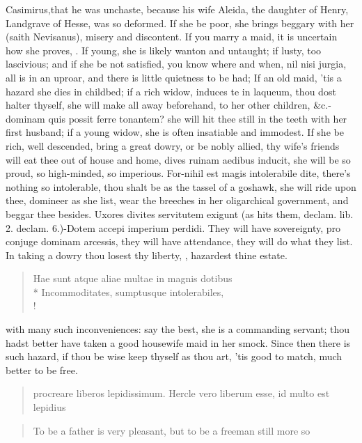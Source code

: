 Casimirus,that he was unchaste, because his wife Aleida, the
daughter of Henry, Landgrave of Hesse, was so deformed. If she be poor,
she brings beggary with her (saith Nevisanus), misery and discontent.
If you marry a maid, it is uncertain how she proves, . If young, she is likely wanton and untaught;
if lusty, too lascivious; and if she be not satisfied, you know where
and when, nil nisi jurgia, all is in an uproar, and there is little
quietness to be had; If an old maid, 'tis a hazard she dies in
childbed; if a rich widow, induces te in laqueum, thou dost
halter thyself, she will make all away beforehand, to her other
children, \&c.-dominam quis possit ferre tonantem? she will hit
thee still in the teeth with her first husband; if a young widow, she
is often insatiable and immodest. If she be rich, well descended, bring
a great dowry, or be nobly allied, thy wife's friends will eat thee out
of house and home, dives ruinam aedibus inducit, she will be so proud,
so high-minded, so imperious. For-nihil est magis intolerabile dite,
there's nothing so intolerable, thou shalt be as the tassel of a
goshawk, she will ride upon thee, domineer as she list, wear the
breeches in her oligarchical government, and beggar thee besides.
Uxores divites servitutem exigunt (as \Seneca{} hits them, declam. lib. 2.
declam. 6.)-Dotem accepi imperium perdidi. They will have sovereignty,
pro conjuge dominam arcessis, they will have attendance, they will do
what they list. In taking a dowry thou losest thy liberty, , hazardest thine estate.

\begin{latin}
\begin{verse}%
Hae sunt atque aliae multae in magnis dotibus\\*
Incommoditates, sumptusque intolerabiles, \etc{}\\!
\end{verse}%
\end{latin}

with many such inconveniences: say the best, she is a commanding
servant; thou hadst better have taken a good housewife maid in her
smock. Since then there is such hazard, if thou be wise keep thyself as
thou art, 'tis good to match, much better to be free.

\begin{latin}
\begin{verse}
procreare liberos lepidissimum.
Hercle vero liberum esse, id multo est lepidius
\end{verse}
\end{latin}
\translationrule%
\begin{verse}%
To be a father is very pleasant,
but to be a freeman still more so
\end{verse}%
%

